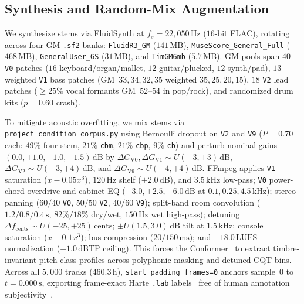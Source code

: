 \subsection{Synthesis and Random-Mix Augmentation}\label{subsec:random_mix}

We synthesize stems via FluidSynth at $f_s = 22{,}050\,\text{Hz}$ ($16$-bit FLAC), rotating across four GM {\small\texttt{.sf2}} banks: {\small\texttt{FluidR3\_GM}} ($141\,\text{MB}$), {\small\texttt{MuseScore\_\allowbreak General\_\allowbreak Full}} ($468\,\text{MB}$), {\small\texttt{GeneralUser\_\allowbreak GS}} ($31\,\text{MB}$), and {\small\texttt{TimGM6mb}} ($5.7\,\text{MB}$). GM pools span $40$ {\small\texttt{V0}} patches ($16$ keyboard/organ/mallet, $12$ guitar/plucked, $12$ synth/pad), $13$ weighted {\small\texttt{V1}} bass patches (GM~$33, 34, 32, 35$ weighted $35, 25, 20, 15$), $18$ {\small\texttt{V2}} lead patches ($\ge 25\%$ vocal formants GM~$52$--$54$ in pop/rock), and randomized drum kits ($p = 0.60$ crash).

To mitigate acoustic overfitting, we mix stems via {\small\texttt{project\_\allowbreak condition\_\allowbreak corpus.py}} using Bernoulli dropout on {\small\texttt{V2}} and {\small\texttt{V9}} ($P = 0.70$ each: $49\%$ four-stem, $21\%$ {\small\texttt{cbm}}, $21\%$ {\small\texttt{cbp}}, $9\%$ {\small\texttt{cb}}) and perturb nominal gains $(0.0, +1.0, -1.0, -1.5)\,\text{dB}$ by $\Delta G_{\text{V0}}, \Delta G_{\text{V1}} \sim U(-3, +3)\,\text{dB}$, $\Delta G_{\text{V2}} \sim U(-3, +4)\,\text{dB}$, and $\Delta G_{\text{V9}} \sim U(-4, +4)\,\text{dB}$. FFmpeg applies {\small\texttt{V1}} saturation ($x - 0.05x^3$), $120\,\text{Hz}$ shelf ($+2.0\,\text{dB}$), and $3.5\,\text{kHz}$ low-pass; {\small\texttt{V0}} power-chord overdrive and cabinet EQ ($-3.0, +2.5, -6.0\,\text{dB}$ at $0.1, 0.25, 4.5\,\text{kHz}$); stereo panning ($60/40$ {\small\texttt{V0}}, $50/50$ {\small\texttt{V2}}, $40/60$ {\small\texttt{V9}}); split-band room convolution ($1.2/0.8/0.4\,\text{s}$, $82\%/18\%$ dry/wet, $150\,\text{Hz}$ wet high-pass); detuning $\Delta f_{\text{cents}} \sim U(-25, +25)\,\text{cents}$; $\pm U(1.5, 3.0)\,\text{dB}$ tilt at $1.5\,\text{kHz}$; console saturation ($x - 0.1x^3$); bus compression ($20/150\,\text{ms}$); and $-18.0\,\text{LUFS}$ normalization ($-1.0\,\text{dBTP}$ ceiling). This forces the Conformer~\cite{gulati2020conformer,akram2026chordformer} to extract timbre-invariant pitch-class profiles across polyphonic masking and detuned CQT bins. Across all $5{,}000$ tracks ($460.3\,\text{h}$), {\small\texttt{start\_\allowbreak padding\_\allowbreak frames=0}} anchors sample~$0$ to $t = 0.000\,\text{s}$, exporting frame-exact Harte {\small\texttt{.lab}} labels~\cite{harte2005symbolic} free of human annotation subjectivity~\cite{koops2019annotator}.
